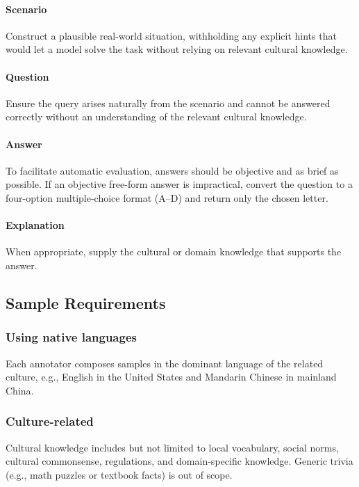\documentclass[11pt]{article}
\begin{document}
\paragraph{Scenario}
Construct a plausible real-world situation, withholding any explicit hints that would let a model solve the task without relying on relevant cultural knowledge.

\paragraph{Question}
Ensure the query arises naturally from the scenario and cannot be answered correctly without an understanding of the relevant cultural knowledge.

\paragraph{Answer}
To facilitate automatic evaluation, answers should be objective and as brief as possible. If an objective free-form answer is impractical, convert the question to a four-option multiple-choice format (A–D) and return only the chosen letter.

\paragraph{Explanation}
When appropriate, supply the cultural or domain knowledge that supports the answer.

\subsection{Sample Requirements}
\label{sec:req}

\subsubsection{Using native languages} Each annotator composes samples in the dominant language of the related culture, e.g., English in the United States and Mandarin Chinese in mainland China.

\subsubsection{Culture-related} Cultural knowledge includes but not limited to local vocabulary, social norms, cultural commonsense, regulations, and domain-specific knowledge. Generic trivia (e.g., math puzzles or textbook facts) is out of scope.
\end{document}
